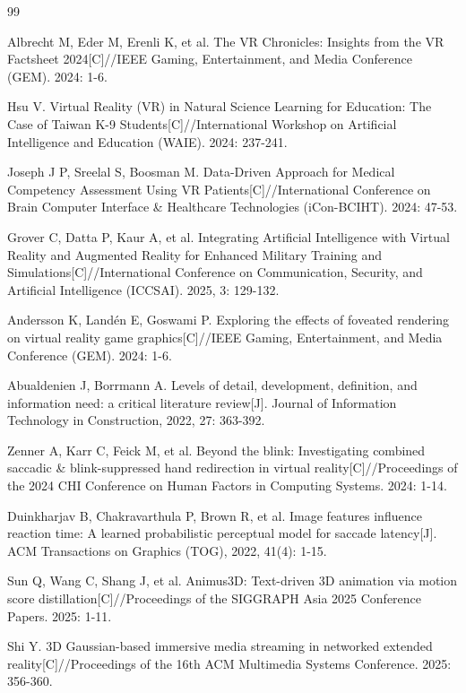 \begin{thebibliography}{99}

Albrecht M, Eder M, Erenli K, et al. The VR Chronicles: Insights from the VR Factsheet 2024[C]//IEEE Gaming, Entertainment, and Media Conference (GEM). 2024: 1-6.

Hsu V. Virtual Reality (VR) in Natural Science Learning for Education: The Case of Taiwan K-9 Students[C]//International Workshop on Artificial Intelligence and Education (WAIE). 2024: 237-241.

Joseph J P, Sreelal S, Boosman M. Data-Driven Approach for Medical Competency Assessment Using VR Patients[C]//International Conference on Brain Computer Interface \& Healthcare Technologies (iCon-BCIHT). 2024: 47-53.

Grover C, Datta P, Kaur A, et al. Integrating Artificial Intelligence with Virtual Reality and Augmented Reality for Enhanced Military Training and Simulations[C]//International Conference on Communication, Security, and Artificial Intelligence (ICCSAI). 2025, 3: 129-132.

Andersson K, Landén E, Goswami P. Exploring the effects of foveated rendering on virtual reality game graphics[C]//IEEE Gaming, Entertainment, and Media Conference (GEM). 2024: 1-6.

Abualdenien J, Borrmann A. Levels of detail, development, definition, and information need: a critical literature review[J]. Journal of Information Technology in Construction, 2022, 27: 363-392.

Zenner A, Karr C, Feick M, et al. Beyond the blink: Investigating combined saccadic \& blink-suppressed hand redirection in virtual reality[C]//Proceedings of the 2024 CHI Conference on Human Factors in Computing Systems. 2024: 1-14.

Duinkharjav B, Chakravarthula P, Brown R, et al. Image features influence reaction time: A learned probabilistic perceptual model for saccade latency[J]. ACM Transactions on Graphics (TOG), 2022, 41(4): 1-15.

Sun Q, Wang C, Shang J, et al. Animus3D: Text-driven 3D animation via motion score distillation[C]//Proceedings of the SIGGRAPH Asia 2025 Conference Papers. 2025: 1-11.

Shi Y. 3D Gaussian-based immersive media streaming in networked extended reality[C]//Proceedings \- of  \- the \- 16th ACM Multi\-media \- Systems Conference. 2025: 356-360.


\end{thebibliography}
